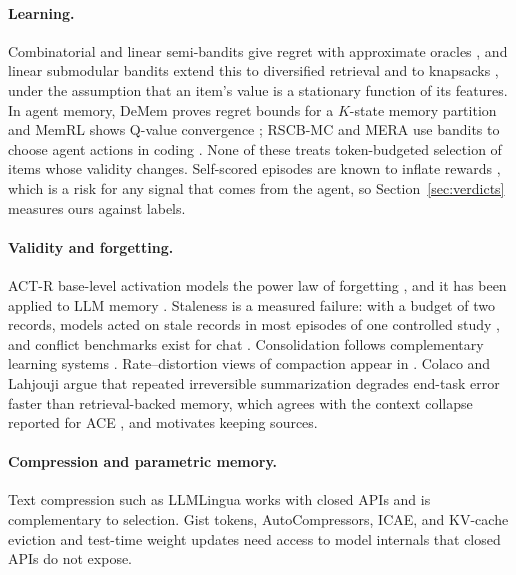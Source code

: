 \paragraph{Learning.} Combinatorial and linear semi-bandits give regret with approximate oracles \cite{chen2013combinatorial,chen2016cmab,kveton2015tight,wen2015efficient}, and linear submodular bandits extend this to diversified retrieval and to knapsacks \cite{yue2011linear,yu2016linear,takemori2020submodular}, under the assumption that an item's value is a stationary function of its features. In agent memory, DeMem proves regret bounds for a $K$-state memory partition \cite{zou2026demem} and MemRL shows Q-value convergence \cite{zhang2026memrl}; RSCB-MC and MERA use bandits to choose agent actions in coding \cite{iscan2026rscb,iscan2026mera}. None of these treats token-budgeted selection of items whose validity changes. Self-scored episodes are known to inflate rewards \cite{asadolahi2026rewardinflation}, which is a risk for any signal that comes from the agent, so Section~\ref{sec:verdicts} measures ours against labels.

\paragraph{Validity and forgetting.} ACT-R base-level activation models the power law of forgetting \cite{anderson1991reflections,anderson2004integrated}, and it has been applied to LLM memory \cite{honda2025actr}. Staleness is a measured failure: with a budget of two records, models acted on stale records in most episodes of one controlled study \cite{nakayashiki2026stale}, and conflict benchmarks exist for chat \cite{tao2026memconflict}. Consolidation follows complementary learning systems \cite{mcclelland1995why,kumaran2016what}. Rate--distortion views of compaction appear in \cite{colaco2026ratedistortion,zou2026demem,sun2026lam}. Colaco and Lahjouji argue that repeated irreversible summarization degrades end-task error faster than retrieval-backed memory, which agrees with the context collapse reported for ACE \cite{zhang2025ace}, and motivates keeping sources.

\paragraph{Compression and parametric memory.} Text compression such as LLMLingua \cite{jiang2023llmlingua,jiang2023longllmlingua,pan2024llmlingua2} works with closed APIs and is complementary to selection. Gist tokens, AutoCompressors, ICAE, and KV-cache eviction \cite{petrov2025gist,chevalier2023autocompressors,ge2023icae,zhang2023h2o,xiao2023streamingllm,li2024snapkv} and test-time weight updates \cite{sun2020ttt,berges2024memorylayers,behrouz2024titans} need access to model internals that closed APIs do not expose.

